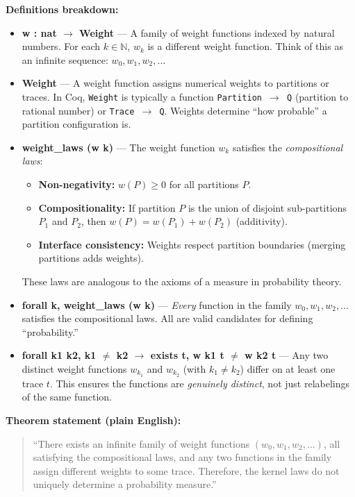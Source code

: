 \textbf{Definitions breakdown:}
\begin{itemize}
    \item \textbf{w : nat $\to$ Weight} — A family of weight functions indexed by natural numbers. For each $k \in \mathbb{N}$, $w_k$ is a different weight function. Think of this as an infinite sequence: $w_0, w_1, w_2, \ldots$
    
    \item \textbf{Weight} — A weight function assigns numerical weights to partitions or traces. In Coq, \texttt{Weight} is typically a function \texttt{Partition $\to$ Q} (partition to rational number) or \texttt{Trace $\to$ Q}. Weights determine ``how probable'' a partition configuration is.
    
    \item \textbf{weight\_laws (w k)} — The weight function $w_k$ satisfies the \textit{compositional laws}:
    \begin{itemize}
        \item \textbf{Non-negativity:} $w(P) \geq 0$ for all partitions $P$.
        \item \textbf{Compositionality:} If partition $P$ is the union of disjoint sub-partitions $P_1$ and $P_2$, then $w(P) = w(P_1) + w(P_2)$ (additivity).
        \item \textbf{Interface consistency:} Weights respect partition boundaries (merging partitions adds weights).
    \end{itemize}
    These laws are analogous to the axioms of a measure in probability theory.
    
    \item \textbf{forall k, weight\_laws (w k)} — \textit{Every} function in the family $w_0, w_1, w_2, \ldots$ satisfies the compositional laws. All are valid candidates for defining ``probability.''
    
    \item \textbf{forall k1 k2, k1 $\neq$ k2 $\to$ exists t, w k1 t $\neq$ w k2 t} — Any two distinct weight functions $w_{k_1}$ and $w_{k_2}$ (with $k_1 \neq k_2$) differ on at least one trace $t$. This ensures the functions are \textit{genuinely distinct}, not just relabelings of the same function.
\end{itemize}

\textbf{Theorem statement (plain English):}
\begin{quote}
``There exists an infinite family of weight functions $(w_0, w_1, w_2, \ldots)$, all satisfying the compositional laws, and any two functions in the family assign different weights to some trace. Therefore, the kernel laws do not uniquely determine a probability measure.''
\end{quote}

